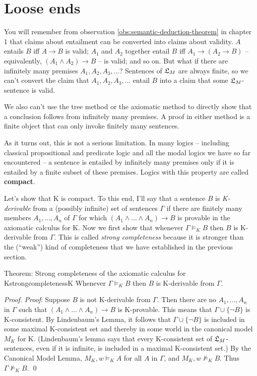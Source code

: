 \section{Loose ends}\label{sec:looseends}

You will remember from observation \ref{obs:semantic-deduction-theorem} in
chapter 1 that claims about entailment can be converted into claims about
validity. $A$ entails $B$ iff $A \to B$ is valid; $A_{1}$ and $A_{2}$ together
entail $B$ iff $A_{1} \to (A_{2} \to B)$ -- equivalently,
$(A_{1}\land A_{2}) \to B$ -- is valid; and so on. But what if there are
infinitely many premises $A_{1},A_{2},A_{3},\ldots$? Sentences of $\mathfrak{L}_{M}$ are
always finite, so we can't convert the claim that $A_{1},A_{2},A_{3},\ldots$
entail $B$ into a claim that some $\mathfrak{L}_{M}$-sentence is valid.

We also can't use the tree method or the axiomatic method to directly show that
a conclusion follows from infinitely many premises. A proof in either method is
a finite object that can only invoke finitely many sentences.

As it turns out, this is not a serious limitation. In many logics -- including
classical propositional and predicate logic and all the modal logics we have so
far encountered -- a sentence is entailed by infinitely many premises only if it
is entailed by a finite subset of these premises. Logics with this property are
called \textbf{compact}.

Let's show that K is compact. To this end, I'll say that a sentence $B$ is
\emph{K-derivable} from a (possibly infinite) set of sentences $\Gamma$ if there
are finitely many members $A_{1},\ldots,A_{n}$ of $\Gamma$ for which
$(A_1 \land \ldots \land A_n) \to B$ is provable in the axiomatic calculus for
K. Now we first show that whenever $\Gamma \models_{K} B$ then $B$ is
K-derivable from $\Gamma$. This is called \emph{strong completeness} because it
is stronger than the (``weak'') kind of completeness that we have established in
the previous section.

\begin{theorem}{Theorem: Strong completeness of the axiomatic calculus for K}{strongcompletenessK}
  Whenever $\Gamma \models_{K} B$ then $B$ is K-derivable from $\Gamma$.
\end{theorem}
\begin{proof}
  \emph{Proof}: Suppose $B$ is not K-derivable from $\Gamma$. Then there are no
  $A_1, \ldots, A_n$ in $\Gamma$ such that $(A_1 \land \ldots \land A_n) \to B$
  is K-provable. This means that $\Gamma \cup \{ \neg B \}$ is K-consistent. By
  Lindenbaum's Lemma, it follows that $\Gamma \cup \{ \neg B \}$ is included in
  some maximal K-consistent set and thereby in some world in the canonical model
  $M_{K}$ for K. (Lindenbaum's lemma says that every K-consistent set of
  $\mathfrak{L}_{M}$-sentences, even if it is infinite, is included in a maximal
  K-consistent set.) By the Canonical Model Lemma, $M_{K}, w \models_K A$ for
  all $A$ in $\Gamma$, and $M_{K}, w \not\models_K B$. Thus
  $\Gamma \not\models_K B$. \qed
\end{proof}

